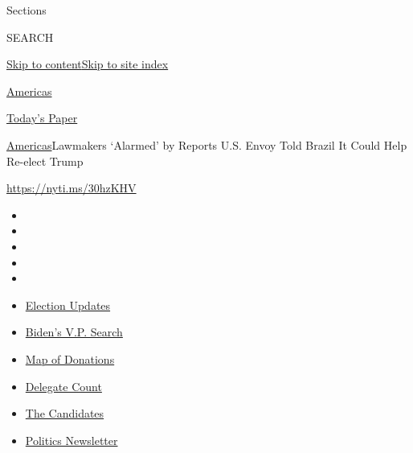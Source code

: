 Sections

SEARCH

\protect\hyperlink{site-content}{Skip to
content}\protect\hyperlink{site-index}{Skip to site index}

\href{https://www.nytimes.com/section/world/americas}{Americas}

\href{https://myaccount.nytimes.com/auth/login?response_type=cookie\&client_id=vi}{}

\href{https://www.nytimes.com/section/todayspaper}{Today's Paper}

\href{/section/world/americas}{Americas}\textbar{}Lawmakers `Alarmed' by
Reports U.S. Envoy Told Brazil It Could Help Re-elect Trump

\url{https://nyti.ms/30hzKHV}

\begin{itemize}
\item
\item
\item
\item
\item
\end{itemize}

\begin{itemize}
\item
  \href{https://www.nytimes.com/2020/07/31/us/elections/biden-vs-trump.html?action=click\&pgtype=Article\&state=default\&region=TOP_BANNER\&context=storylines_menu}{Election
  Updates}
\item
  \href{https://www.nytimes.com/article/biden-vice-president-2020.html?action=click\&pgtype=Article\&state=default\&region=TOP_BANNER\&context=storylines_menu}{Biden's
  V.P. Search}
\item
  \href{https://www.nytimes.com/interactive/2020/07/24/us/politics/trump-biden-campaign-donors.html?action=click\&pgtype=Article\&state=default\&region=TOP_BANNER\&context=storylines_menu}{Map
  of Donations}
\item
  \href{https://www.nytimes.com/interactive/2020/us/elections/delegate-count-primary-results.html?action=click\&pgtype=Article\&state=default\&region=TOP_BANNER\&context=storylines_menu}{Delegate
  Count}
\item
  \href{https://www.nytimes.com/interactive/2019/us/politics/2020-presidential-candidates.html?action=click\&pgtype=Article\&state=default\&region=TOP_BANNER\&context=storylines_menu}{The
  Candidates}
\item
  \href{https://www.nytimes.com/newsletters/politics?action=click\&pgtype=Article\&state=default\&region=TOP_BANNER\&context=storylines_menu}{Politics
  Newsletter}
\end{itemize}

